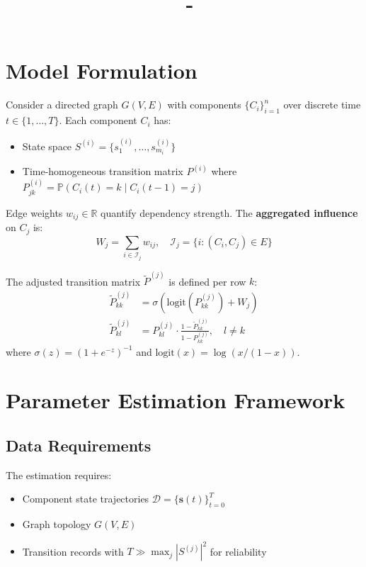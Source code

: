 \documentclass[answers,12pt,addpoints]{exam}
\author{\name}
\title{\course \ - \assignment}
\begin{document}
\maketitle

\newpage


\section{Model Formulation}
Consider a directed graph $G(V,E)$ with components $\{C_i\}_{i=1}^n$ over discrete time $t \in \{1,\dots,T\}$. Each component $C_i$ has:
\begin{itemize}
    \item State space $S^{(i)} = \{s^{(i)}_1,\dots,s^{(i)}_{m_i}\}$
    \item Time-homogeneous transition matrix $P^{(i)}$ where $P^{(i)}_{jk} = \mathbb{P}(C_i(t) = k \mid C_i(t-1) = j)$
\end{itemize}

Edge weights $w_{ij} \in \mathbb{R}$ quantify dependency strength. The \textbf{aggregated influence} on $C_j$ is:
\begin{equation}
W_j = \sum_{i \in \mathcal{I}_j} w_{ij}, \quad \mathcal{I}_j = \{i : (C_i, C_j) \in E\}
\end{equation}

The adjusted transition matrix $\widetilde{P}^{(j)}$ is defined per row $k$:
\begin{align}
\widetilde{P}^{(j)}_{kk} &= \sigma\left( \mathrm{logit}\left(P^{(j)}_{kk}\right) + W_j \right) \\
\widetilde{P}^{(j)}_{kl} &= P^{(j)}_{kl} \cdot \frac{1 - \widetilde{P}^{(j)}_{kk}}{1 - P^{(j)}_{kk}}, \quad l \neq k
\end{align}
where $\sigma(z) = (1 + e^{-z})^{-1}$ and $\mathrm{logit}(x) = \log(x/(1-x))$.

\section{Parameter Estimation Framework}

\subsection{Data Requirements}
The estimation requires:
\begin{itemize}
    \item Component state trajectories $\mathcal{D} = \{\mathbf{s}(t)\}_{t=0}^T$
    \item Graph topology $G(V,E)$
    \item Transition records with $T \gg \max_j |S^{(j)}|^2$ for reliability
\end{itemize}
\end{document}

